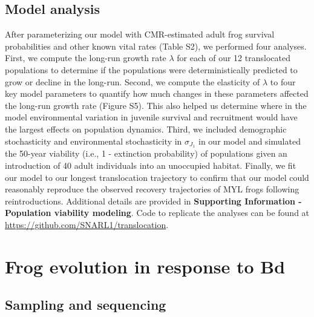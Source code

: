\documentclass[9pt,twocolumn,twoside,lineno]{pnas-new}
\begin{document}
{\hypertarget{model-analysis}{%
\subsection*{Model analysis}\label{model-analysis}}

After parameterizing our model with CMR-estimated adult frog survival
probabilities and other known vital rates
(Table S2), we performed four analyses. First, we
compute the long-run growth rate \(\lambda\) for each of our 12
translocated populations to determine if the populations were
deterministically predicted to grow or decline in the long-run. Second,
we compute the elasticity of \(\lambda\) to four key model parameters to
quantify how much changes in these parameters affected the long-run
growth rate (Figure S5). This also helped us
determine where in the model environmental variation in juvenile
survival and recruitment would have the largest effects on population
dynamics. Third, we included demographic stochasticity and environmental
stochasticity in \(\sigma_{J_1}\) in our model and simulated the 50-year
viability (i.e., 1 - extinction probability) of populations given an
introduction of 40 adult individuals into an unoccupied habitat.
Finally, we fit our model to our longest translocation trajectory to
confirm that our model could reasonably reproduce the observed recovery
trajectories of MYL frogs following reintroductions. Additional details
are provided in \textbf{Supporting Information - Population viability
modeling}. Code to replicate the analyses can be found at
\url{https://github.com/SNARL1/translocation}.

\hypertarget{frog-evolution-in-response-to-bd-1}{%
\section*{Frog evolution in response to
Bd}\label{frog-evolution-in-response-to-bd-1}}

\hypertarget{sampling-and-sequencing}{%
\subsection*{Sampling and sequencing}\label{sampling-and-sequencing}}

}
\end{document}
